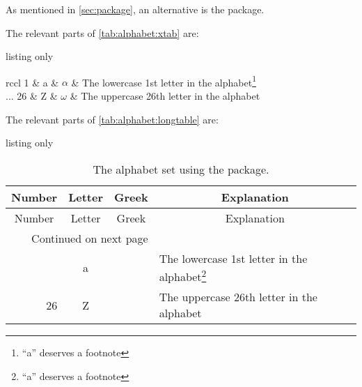 As mentioned in \cref{sec:package}, an alternative
is the  package.

\clearpage
The relevant parts of \cref{tab:alphabet:xtab} are:
\begin{tcblisting}{listing only}
\tablelasttail{\bottomrule}
%
\label{tab:alphabet:xtab0}
\begin{center}
  \begin{mpxtabular}{rccl}
   1 & a & \(\alpha\)   & The lowercase 1st letter in the alphabet\footnote{%
    \enquote{a} deserves a footnote}\\
    ...
    26 & Z & \(\omega\) & The uppercase 26th letter in the alphabet\\
  \end{mpxtabular}
\end{center}
\end{tcblisting}

\clearpage
The relevant parts of \cref{tab:alphabet:longtable} are:
\begin{tcblisting}{listing only}
\begin{longtable}{rccl}
  \caption{The alphabet set using the  package.%
  \label{tab:alphabet:longtable0}}\\
  \toprule
  \multicolumn{1}{c}{Number} &
  \multicolumn{1}{c}{Letter} &
  \multicolumn{1}{c}{Greek} &
  \multicolumn{1}{c}{Explanation}\\
  \midrule
\endfirsthead
  \midrule
  \multicolumn{1}{c}{Number} &
  \multicolumn{1}{c}{Letter} &
  \multicolumn{1}{c}{Greek} &
  \multicolumn{1}{c}{Explanation}\\
  \midrule
\endhead
  \midrule
  \multicolumn{3}{r}{Continued on next page}\\
  \midrule
\endfoot
  \bottomrule
\endlastfoot
    1 & a & & The lowercase 1st letter in the alphabet\footnote{%
    \enquote{a} deserves a footnote}\\
    26 & Z & & The uppercase 26th letter in the alphabet\\
\end{longtable}
\end{tcblisting}

